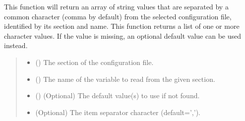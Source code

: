 \documentclass[letterpaper,10pt,english]{sphinxmanual}
\begin{document}
\begin{fulllineitems}
\begin{fulllineitems}
\label{\detokenize{modules/input/config_handler:qnav.input.config_handler.ConfigHandler.get_csv_str}}
\pysigstartsignatures
{}
\pysigstopsignatures
\sphinxAtStartPar
This function will return an array of string values that are
separated by a common character (comma by default) from the selected
configuration file, identified by its section and name. This function
returns a list of one or more character values. If the value is
missing, an optional default value can be used instead.
\begin{quote}\begin{description}
\begin{itemize}
\item {} 
\sphinxAtStartPar
{} () \textendash{} The section of the configuration file.

\item {} 
\sphinxAtStartPar
{} () \textendash{} The name of the variable to read from the given section.

\item {} 
\sphinxAtStartPar
{} (\sphinxstyleliteralemphasis{\sphinxupquote{ | }}) \textendash{} (Optional) The default value(s) to use if not found.

\item {} 
\sphinxAtStartPar
{} \textendash{} (Optional) The item separator character (default=’,’).

\end{itemize}


\end{description}
\end{quote}
\end{fulllineitems}
\end{fulllineitems}
\end{document}
